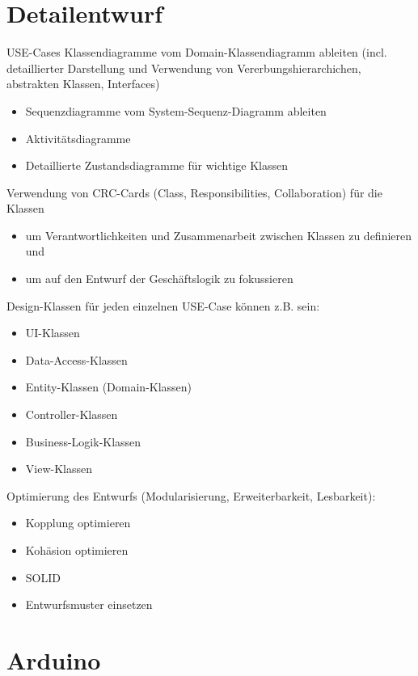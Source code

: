 \section{Detailentwurf}
USE-Cases
Klassendiagramme vom Domain-Klassendiagramm ableiten (incl. detaillierter Darstellung und Verwendung von Vererbungshierarchichen, abstrakten Klassen, Interfaces)
\begin{itemize}
	\item Sequenzdiagramme vom System-Sequenz-Diagramm ableiten
	\item Aktivitätsdiagramme
	\item Detaillierte Zustandsdiagramme für wichtige Klassen
\end{itemize}

Verwendung von CRC-Cards (Class, Responsibilities, Collaboration) für die Klassen
\begin{itemize}
	\item um Verantwortlichkeiten und Zusammenarbeit zwischen Klassen zu definieren und
	\item um auf den Entwurf der Geschäftslogik zu fokussieren
\end{itemize}

Design-Klassen für jeden einzelnen USE-Case können z.B. sein:

\begin{itemize}
	\item UI-Klassen
	\item Data-Access-Klassen
	\item Entity-Klassen (Domain-Klassen)
	\item Controller-Klassen
	\item Business-Logik-Klassen
	\item View-Klassen
\end{itemize}

Optimierung des Entwurfs (Modularisierung, Erweiterbarkeit, Lesbarkeit):

\begin{itemize}
	\item Kopplung optimieren
	\item Kohäsion optimieren
	\item SOLID
	\item Entwurfsmuster einsetzen
\end{itemize}

\newpage
\def \currentAuthor{Kevin Glatz}

\section{Arduino}

